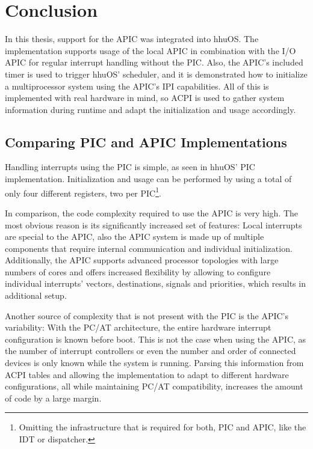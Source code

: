 \chapter{Conclusion}
\label{ch:conclusion}

In this thesis, support for the APIC was integrated into hhuOS\@.
The implementation supports usage of the local APIC in combination with the I/O APIC for regular interrupt handling without the PIC\@.
Also, the APIC's included timer is used to trigger hhuOS' scheduler, and it is demonstrated how to initialize a multiprocessor system using the APIC's IPI capabilities.
All of this is implemented with real hardware in mind, so ACPI is used to gather system information during runtime and adapt the initialization and usage accordingly.

\clearpage

\section{Comparing PIC and APIC Implementations}
\label{sec:comparingpicapic}

Handling interrupts using the PIC is simple, as seen in hhuOS' PIC implementation.
Initialization and usage can be performed by using a total of only four different registers, two per PIC\footnote{
  Omitting the infrastructure that is required for both, PIC and APIC, like the IDT or dispatcher.}.

In comparison, the code complexity required to use the APIC is very high.
The most obvious reason is its significantly increased set of features: Local interrupts are special to the APIC, also the APIC system is made up of multiple components that require internal communication and individual initialization.
Additionally, the APIC supports advanced processor topologies with large numbers of cores and offers increased flexibility by allowing to configure individual interrupts' vectors, destinations, signals and priorities, which results in additional setup.

Another source of complexity that is not present with the PIC is the APIC's variability: With the PC/AT architecture, the entire hardware interrupt configuration is known before boot.
This is not the case when using the APIC, as the number of interrupt controllers or even the number and order of connected devices is only known while the system is running.
Parsing this information from ACPI tables and allowing the implementation to adapt to different hardware configurations, all while maintaining PC/AT compatibility, increases the amount of code by a large margin.

